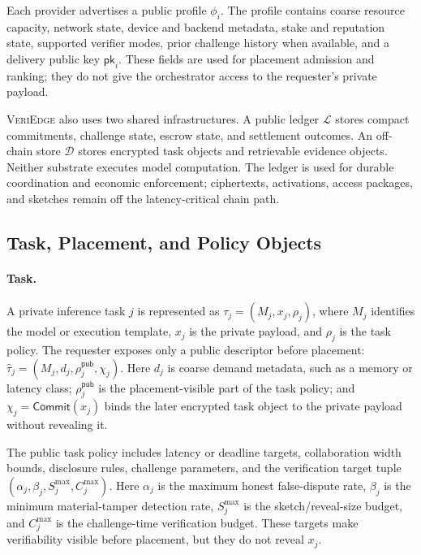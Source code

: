 \documentclass[sigplan,screen,review,anonymous]{acmart}
\newcommand{\system}{\textsc{VeriEdge}\xspace}
\begin{document}
Each provider advertises a public profile \(\phi_i\). The profile contains
coarse resource capacity, network state, device and backend metadata, stake and
reputation state, supported verifier modes, prior challenge history when
available, and a delivery public key \(\mathsf{pk}_i\). These fields are
used for placement admission and ranking; they do not give the orchestrator
access to the requester's private payload.

\system also uses two shared infrastructures. A public ledger
\(\mathcal{L}\) stores compact commitments, challenge state, escrow state,
and settlement outcomes. An off-chain store \(\mathcal{D}\) stores encrypted
task objects and retrievable evidence objects. Neither substrate executes
model computation. The ledger is used for durable coordination and economic
enforcement; ciphertexts, activations, access packages, and sketches remain
off the latency-critical chain path.

\subsection{Task, Placement, and Policy Objects}
\label{subsec:task_model}

\paragraph{Task.}
A private inference task \(j\) is represented as
\(\tau_j=(M_j,x_j,\rho_j)\), where \(M_j\) identifies the model or execution
template, \(x_j\) is the private payload, and \(\rho_j\) is the task policy.
The requester exposes only a public descriptor before placement:
\(\widehat{\tau}_j=(M_j,d_j,\rho^{\mathsf{pub}}_j,\chi_j)\). Here \(d_j\)
is coarse demand metadata, such as a memory or latency class;
\(\rho^{\mathsf{pub}}_j\) is the placement-visible part of the task policy;
and \(\chi_j=\mathsf{Commit}(x_j)\) binds the later encrypted task object to
the private payload without revealing it.

The public task policy includes latency or deadline targets, collaboration
width bounds, disclosure rules, challenge parameters, and the verification
target tuple \((\alpha_j,\beta_j,S^{\max}_j,C^{\max}_j)\). Here
\(\alpha_j\) is the maximum honest false-dispute rate,
\(\beta_j\) is the minimum material-tamper detection rate,
\(S^{\max}_j\) is the sketch/reveal-size budget, and
\(C^{\max}_j\) is the challenge-time verification budget. These targets
make verifiability visible before placement, but they do not reveal
\(x_j\).
\end{document}
